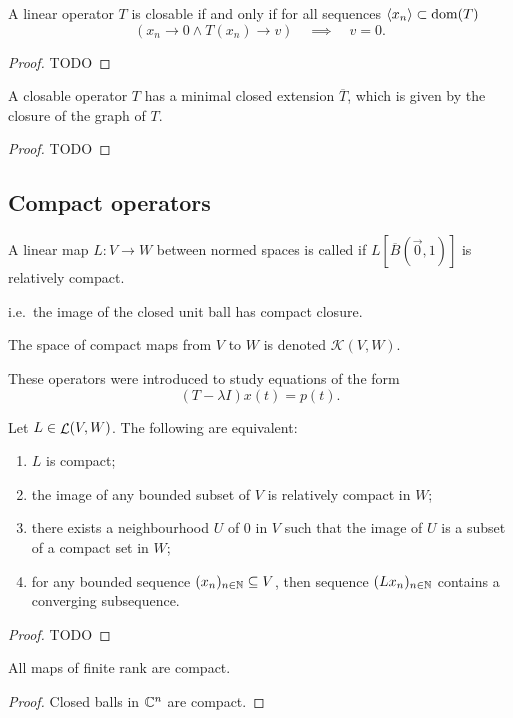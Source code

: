 \begin{proposition}
A linear operator $T$ is closable \textup{if and only if} for all sequences $\left\langle x_n \right\rangle\subset\operatorname{dom}(T)$
\[ \left(x_n\to 0 \land T(x_n)\to v\right) \quad\implies\quad v = 0. \]
\end{proposition}
\begin{proof}
TODO
\end{proof}

\begin{lemma}
A closable operator $T$ has a minimal closed extension $\overline{T}$, which is given by the closure of the graph of $T$.
\end{lemma}
\begin{proof}
TODO
\end{proof}

\subsection{Compact operators}
\begin{definition}
A linear map $L:V\to W$ between normed spaces is called  if $L[\overline{B}(\vec{0}, 1)]$ is relatively compact.

i.e.\ the image of the closed unit ball has compact closure.

The space of compact maps from $V$ to $W$ is denoted $\mathcal{K}(V,W)$.
\end{definition}

These operators were introduced to study equations of the form
\[ (T-\lambda I)x(t) = p(t). \]

\begin{proposition}
Let $L\in\mathop{\mathcal{L}}(V,W)$. The following are equivalent:
\begin{enumerate}
\item $L$ is compact;
\item the image of any bounded subset of $V$ is relatively compact in $W$;
\item there exists a neighbourhood $U$ of $0$ in $V$ such that the image of $U$ is a subset of a compact set in $W$;
\item for any bounded sequence $(x_n)_{n\in\mathbb{N}} \subseteq V$, then sequence $(Lx_n)_{n\in\mathbb{N}}$ contains a converging subsequence.
\end{enumerate}
\end{proposition}
\begin{proof}
TODO
\end{proof}
\begin{corollary}
All maps of finite rank are compact.
\end{corollary}
\begin{proof}
Closed balls in $\mathbb{C}^n$ are compact.
\end{proof}

